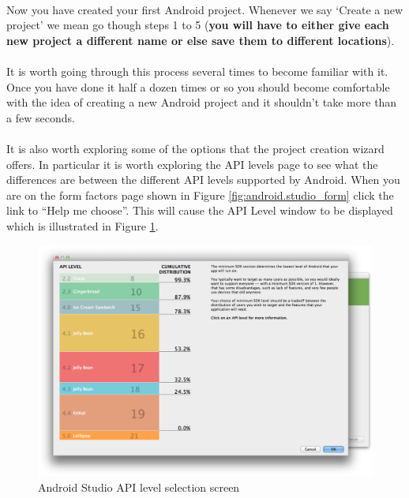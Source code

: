 \paragraph{} Now you have created your first Android project. Whenever we say `Create a new project' we mean go though steps 1 to 5 ({\bf{you will have to either give each new project a different name or else save them to different locations}}).

\paragraph{} It is worth going through this process several times to become familiar with it. Once you have done it half a dozen times or so you should become comfortable with the idea of creating a new Android project and it shouldn't take more than a few seconds.

\paragraph{} It is also worth exploring some of the options that the project creation wizard offers. In particular it is worth exploring the API levels page to see what the differences are between the different API levels supported by Android. When you are on the form factors page shown in Figure \ref{fig:android.studio_form} click the link to ``Help me choose''. This will cause the API Level window to be displayed which is illustrated in Figure \ref{fig:android.studio_apilevel}.

\begin{figure}[H]
\centering
\includegraphics[width=\textwidth]{images/android-studio_04_api-level}
\caption{Android Studio API level selection screen}
\label{fig:android.studio_apilevel}
\end{figure}


